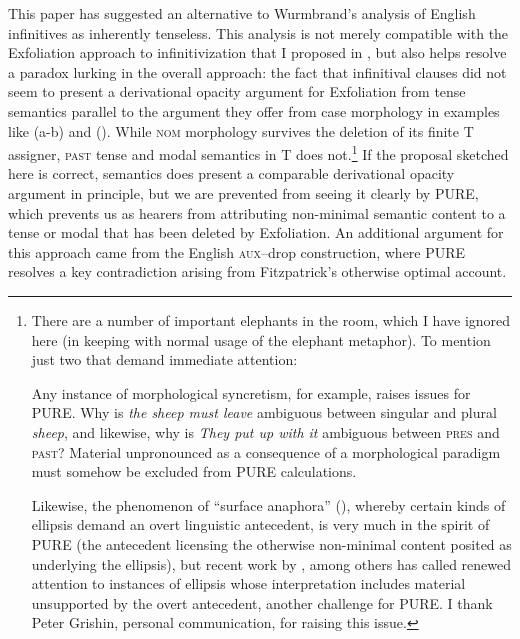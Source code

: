 \documentclass[output=paper]{langscibook}
\begin{document}
This paper has suggested an alternative to Wurmbrand's \citeyearpar{Wurmbrand:2014aa} analysis of English infinitives as inherently tenseless. This analysis is not merely compatible with the Exfoliation approach to infinitivization that I proposed in \citet{Pesetsky:2019aa}, but also helps resolve a paradox lurking in the overall approach: the fact that infinitival clauses did not seem to present a derivational opacity argument for Exfoliation from tense semantics parallel to the argument they offer from case morphology in examples like (a-b) and (). While \textsc{nom }morphology survives the deletion of its finite T assigner, \textsc{past }tense and modal semantics in T does not.\footnote{There are a number of important elephants in the room, which I have ignored here (in keeping with normal usage of the elephant metaphor). To mention just two that demand immediate attention: 

Any instance of morphological syncretism, for example, raises issues for PURE.  Why is \textit{the sheep must leave} ambiguous between singular and plural \textit{sheep}, and likewise, why is \textit{They put up with it} ambiguous between \textsc{pres} and \textsc{past}? Material unpronounced as a consequence of a morphological paradigm must somehow be excluded from PURE calculations. 


Likewise, the phenomenon of ``surface anaphora'' (\citealt{Hankamer1976a}), whereby certain kinds of ellipsis demand an overt linguistic antecedent, is very much in the spirit of PURE (the antecedent licensing the otherwise non-minimal content posited as underlying the ellipsis), but recent work by \citealt{Rudin:2019aa}, among others has called renewed attention to instances of ellipsis whose interpretation includes material unsupported by the overt antecedent, another challenge for PURE. I thank Peter Grishin, personal communication, for raising this issue.} 
If the proposal sketched here is correct, semantics does present a comparable derivational opacity argument in principle, but we are prevented from seeing it clearly by PURE, which prevents us as hearers from attributing non-minimal semantic content to a tense or modal that has been deleted by Exfoliation. An additional argument for this approach came from the English \textsc{aux}--drop construction, where PURE resolves a key contradiction arising from Fitzpatrick's otherwise optimal account.
\end{document}
